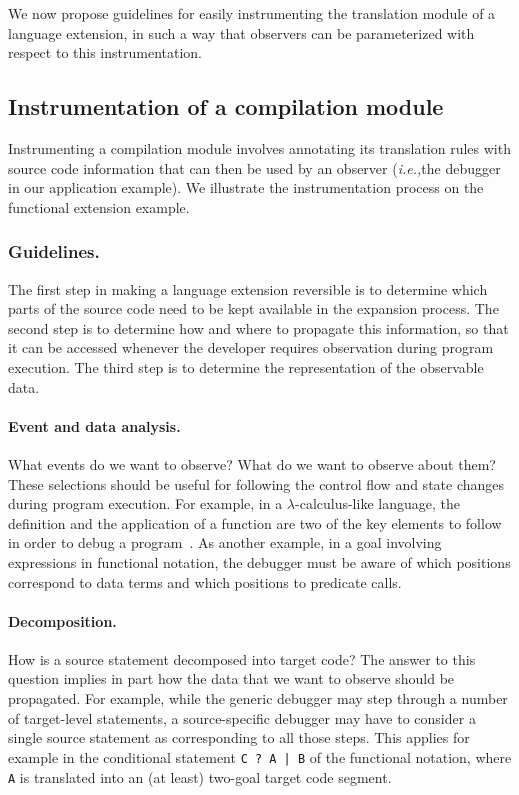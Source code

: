 \documentclass[preprint]{llncs}
\newcommand{\ie}{\emph{i.e.,\xspace}}
\newcommand{\pre}[1]{\texttt{#1}}
\begin{document}
We now propose guidelines for easily instrumenting the translation
module of a language extension, in such a way that observers can be
parameterized with respect to this instrumentation.

\subsection{Instrumentation of a compilation module}

Instrumenting a compilation module involves annotating its translation rules
with source code information that can then be used by an observer (\ie the
debugger in our application example). 
We illustrate the instrumentation process on the functional extension
example.

\subsubsection{Guidelines.}

The first step in making a language extension reversible is to determine which
parts of the source code need to be kept available in the expansion process.
The second step is to determine how and where to propagate this information,
so that it can be  accessed whenever the developer requires observation during 
program execution. The third step is to determine the representation of the 
observable data.

\paragraph{Event and data analysis.} What events do we want to
observe? What do we want to observe about them? These selections
should be useful for following the control flow and state changes
during program execution. For example, in a $\lambda$-calculus-like
language, the definition and the application of a function are two of
the key elements to follow in order to debug a
program~\cite{tolmach}. As another example, in a goal involving
expressions in functional notation, the debugger must be aware of
which positions correspond to data terms and which positions to
predicate calls.

\paragraph{Decomposition.} How is a source statement decomposed into
target code? The answer to this question implies in part how the data
that we want to observe should be propagated. For example, while the
generic debugger may step through a number of target-level statements,
a source-specific debugger may have to consider a single source
statement as corresponding to all those steps. This applies for
example in the conditional statement \pre{C ? A | B} of the functional
notation, where \pre{A} is translated into an (at least) two-goal
target code segment.
\end{document}
